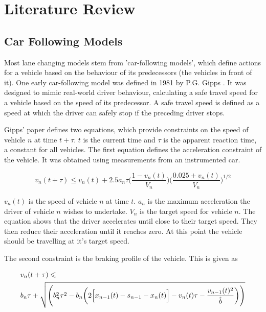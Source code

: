\chapter{Literature Review}
\label{cha:Literature Review}

\section{Car Following Models}
\label{sec:Car Following Models}

Most lane changing models stem from 'car-following models', which define actions for a vehicle based on the behaviour of its predecessors (the vehicles in front of it). One early car-following model was defined in 1981 by P.G. Gipps \citep{Gipps1981}. It was designed to mimic real-world driver behaviour, calculating a safe travel speed for a vehicle based on the speed of its predecessor. A safe travel speed is defined as a speed at which the driver can safely stop if the preceding driver stops.

Gipps' paper defines two equations, which provide constraints on the speed of vehicle $n$ at time $t + \tau$. $t$ is the current time and $\tau$ is the apparent reaction time, a constant for all vehicles. The first equation defines the acceleration constraint of the vehicle. It was obtained using measurements from an instrumented car.

\begin{equation}\label{Gipps1981Accel}
v_n(t+\tau) \leqslant v_n(t) + 2.5a_n\tau\Biggl(\frac{1 - v_n(t)}{V_n}\Biggr)\Biggl(\frac{0.025 + v_n(t)}{V_n}\Biggr)^{1/2}
\end{equation}

$v_n(t)$ is the speed of vehicle $n$ at time $t$. $a_n$ is the maximum acceleration the driver of vehicle $n$ wishes to undertake. $V_n$ is the target speed for vehicle $n$. The equation shows that the driver accelerates until close to their target speed. They then reduce their acceleration until it reaches zero. At this point the vehicle should be travelling at it's target speed.

The second constraint is the braking profile of the vehicle. This is given as

\begin{equation}\label{Gipps1981Brake}
\begin{split}
&v_n(t+\tau) \leqslant \\
&b_n\tau + \sqrt{\Biggl(b_n^2\tau^2 - b_n\biggl(2\Bigl[x_{n-1}(t) - s_{n-1} - x_n(t)\Bigr] - v_n(t)\tau - \frac{v_{n-1}(t)^2}{\hat{b}}\biggr)\Biggr)}
\end{split}
\end{equation}

